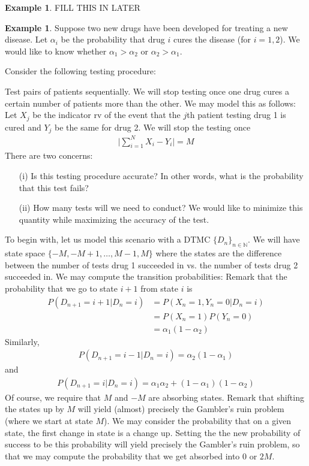 \documentclass[11pt]{amsart}
\theoremstyle{definition}
\newtheorem{example}[theorem]{Example}
\numberwithin{equation}{section}
\begin{document}
 \begin{example}
     FILL THIS IN LATER
 \end{example}
 \begin{example}
     Suppose two new drugs have been developed for treating a new disease. Let $\alpha_i$ be the probability that drug $i$ cures the disease (for $i=1,2$). We would like to know whether $\alpha_1>\alpha_2$ or $\alpha_2>\alpha_1$.

     Consider the following testing procedure:

     Test pairs of patients sequentially. We will stop testing once one drug cures a certain number of patients more than the other. We may model this as follows: Let $X_j$ be the indicator rv of the event that the $j$th patient testing drug 1 is cured and $Y_j$ be the same for drug 2. We will stop the testing once
     \begin{align*}
         \vert\sum_{i=1}^NX_i-Y_i\vert=M
     \end{align*}
     There are two concerns:
     \begin{enumerate}
         \item [(i)] Is this testing procedure accurate? In other words, what is the probability that this test fails?
         \item [(ii)] How many tests will we need to conduct? We would like to minimize this quantity while maximizing the accuracy of the test.
     \end{enumerate}
     To begin with, let us model this scenario with a DTMC $\{D_n\}_{n\in\mathbb N}$. We will have state space $\{-M,-M+1,\ldots,M-1,M\}$ where the states are the difference between the number of tests drug 1 succeeded in vs. the number of tests drug 2 succeeded in. We may compute the transition probabilities: Remark that the probability that we go to state $i+1$ from state $i$ is
     \begin{align*}
         P(D_{n+1}=i+1|D_n=i)&=P(X_n=1,Y_n=0|D_n=i)\\
         &=P(X_n=1)P(Y_n=0)\\
         &=\alpha_1(1-\alpha_2)
     \end{align*}
     Similarly,
     \begin{align*}
         P(D_{n+1}=i-1|D_n=i)=\alpha_2(1-\alpha_1)
     \end{align*}
     and
     \begin{align*}
         P(D_{n+1}=i|D_n=i)=\alpha_1\alpha_2+(1-\alpha_1)(1-\alpha_2)
     \end{align*}
     Of course, we require that $M$ and $-M$ are absorbing states. Remark that shifting the states up by $M$ will yield (almost) precisely the Gambler's ruin problem (where we start at state $M$). We may consider the probability that on a given state, the first change in state is a change up. Setting the the new probability of success to be this probability will yield precisely the Gambler's ruin problem, so that we may compute the probability that we get absorbed into $0$ or $2M$.


\end{example}
\end{document}
